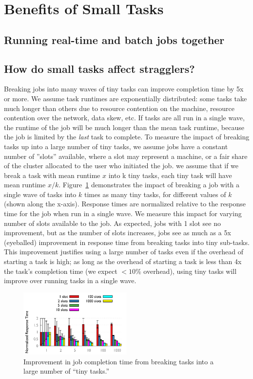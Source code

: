 \section{Benefits of Small Tasks}
\subsection{Running real-time and batch jobs together}
\subsection{How do small tasks affect stragglers?}
Breaking jobs into many waves of tiny tasks can improve completion time by 5x or more.  We assume task runtimes are exponentially distributed: some tasks take much longer than others due to resource contention on the machine, resource contention over the network, data skew, etc.  If tasks are all run in a single wave, the runtime of the job will be much longer than the mean task runtime, because the job is limited by the \emph{last} task to complete.  To measure the impact of breaking tasks up into a large number of tiny tasks, we assume jobs have a constant number of ''slots'' available, where a slot may represent a machine, or a fair share of the cluster allocated to the user who initiated the job.  we assume that if we break a task with mean runtime $x$ into k tiny tasks, each tiny task will have mean runtime $x/k$.  Figure~\ref{fig:outliers} demonstrates the impact of breaking a job with a single wave of tasks into $k$ times as many tiny tasks, for different values of $k$ (shown along the x-axis).  Response times are normalized relative to the response time for the job when run in a single wave.  We measure this impact for varying number of slots available to the job.  As expected, jobs with 1 slot see no improvement, but as the number of slots increases, jobs see as much as a 5x (eyeballed) improvement in response time from breaking tasks into tiny sub-tasks. This improvement justifies using a large number of tasks even if the overhead of starting a task is high; as long as the overhead of starting a task is less than 4x the task's completion time (we expect $<10$\% overhead), using tiny tasks will improve over running tasks in a single wave.

\begin{figure}[t]
\centering
\hspace{2ex}
\includegraphics[width=0.5\textwidth]{figures/results_stragglers}
\vspace{-4ex}
\caption{Improvement in job completion time from breaking tasks into a large number of ``tiny tasks.'' }
\vspace{-2ex}
\label{fig:outliers}
\end{figure}

